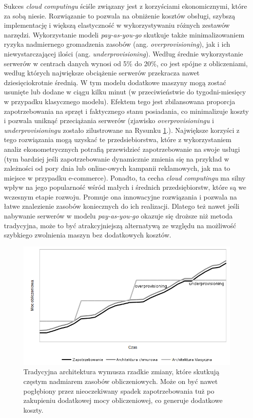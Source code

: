 \documentclass[12pt,a4paper,twoside]{article}
\begin{document}
Sukces \textit{cloud computingu} ściśle związany jest z korzyściami ekonomicznymi, które za sobą niesie. Rozwiązanie to pozwala na obniżenie kosztów obsługi, szybszą implementację i większą elastyczność w wykorzystywaniu różnych zestawów narzędzi. Wykorzystanie modeli \textit{pay-as-you-go} skutkuje także minimalizowaniem ryzyka nadmiernego gromadzenia zasobów (ang. \textit{overprovisioning}), jak i ich niewystarczającej ilości (ang. \textit{underprovisioning}). Według \citet{armburst2010} średnie wykorzystanie serwerów w centrach danych wynosi od 5\% do 20\%, co jest spójne z obliczeniami, według których największe obciążenie serwerów przekracza nawet dziesięciokrotnie średnią.  W tym modelu dodatkowe maszyny mogą zostać usunięte lub dodane w ciągu kilku minut (w przeciwieństwie do tygodni-miesięcy w przypadku klasycznego modelu). Efektem tego jest zbilansowana proporcja zapotrzebowania na sprzęt i faktycznego stanu posiadania, co minimalizuje koszty i pozwala uniknąć przeciążania serwerów (zjawisko \textit{overprovisioningu} i \textit{underprovisioningu} zostało zilustrowane na Rysunku \ref{fig:overp}.). Największe korzyści z tego rozwiązania mogą uzyskać te przedsiebiorstwa, które z wykorzystaniem analiz ekonometrycznych potrafią przewidzieć zapotrzebowanie na swoje usługi (tym bardziej jeśli zapotrzebowanie dynamicznie zmienia się na przykład w zależności od pory dnia lub online-owych kampanii reklamowych, jak ma to miejsce w przypadku e-commerce). Ponadto, ta cecha \textit{cloud computingu} ma silny wpływ na jego popularność wśród małych i średnich przedsiębiorstw, które są we wczesnym etapie rozwoju. Promuje ona innowacyjne rozwiązania i pozwala na łatwe znalezienie zasobów koniecznych do ich realizacji. Dlatego też nawet jeśli nabywanie serwerów w modelu \textit{pay-as-you-go} okazuje się droższe niż metoda tradycyjna, może to być atrakcyjniejszą alternatywą ze względu na możliwość szybkiego zwolnienia maszyn bez dodatkowych kosztów.

\begin{figure}[h]
  \centering
\includegraphics[scale=0.8]{../obrazy/fig:overp.png}
\caption{Tradycyjna architektura wymusza rzadkie zmiany, które skutkują częstym nadmiarem zasobów obliczeniowych. Może on być nawet pogłębiony przez nieoczekiwany spadek zapotrzebowania tuż po zakupieniu dodatkowej mocy obliczeniowej, co generuje dodatkowe koszty. \label{fig:overp}}
\end{figure}
\end{document}
